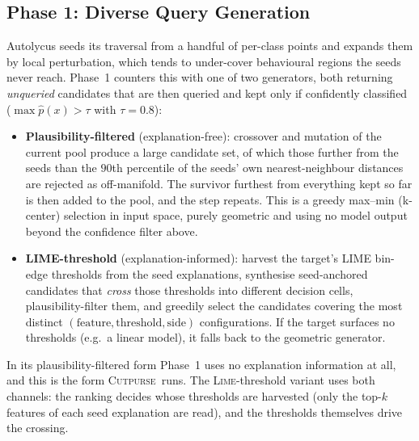 \documentclass[sigconf,anonymous,review]{acmart}
\newcommand{\sys}{\textsc{Cutpurse}}
\begin{document}
\subsection{Phase 1: Diverse Query Generation}
\label{subsec:diverse}
Autolycus seeds its traversal from a handful of per-class points and expands them by
local perturbation, which tends to under-cover behavioural regions the seeds never
reach. Phase~1 counters this with one of two generators, both returning \emph{unqueried}
candidates that are then queried and kept only if confidently classified
($\max \hat{p}(x) > \tau$ with $\tau = 0.8$):
\begin{itemize}
  \item \textbf{Plausibility-filtered} (explanation-free): crossover and mutation of the current
  pool produce a large candidate set, of which those further from the seeds than the $90$th
  percentile of the seeds' own nearest-neighbour distances are rejected as off-manifold. The
  survivor furthest from everything kept so far is then added to the pool, and the step repeats. This
  is a greedy max--min (k-center) selection in input space, purely geometric and using no model
  output beyond the confidence filter above.
  \item \textbf{LIME-threshold} (explanation-informed): harvest the target's LIME
  bin-edge thresholds from the seed explanations, synthesise
  seed-anchored candidates that \emph{cross} those thresholds into different decision
  cells, plausibility-filter them, and greedily select the candidates covering the most
  distinct $(\text{feature}, \text{threshold}, \text{side})$ configurations. If the
  target surfaces no thresholds (e.g.\ a linear model), it falls back to the geometric
  generator.
\end{itemize}
In its plausibility-filtered form Phase~1 uses no explanation information at all, and this is the
form \sys\ runs. The \textsc{Lime}-threshold variant uses both channels: the ranking decides whose
thresholds are harvested (only the top-$k$ features of each seed explanation are read), and the
thresholds themselves drive the crossing.
\end{document}

